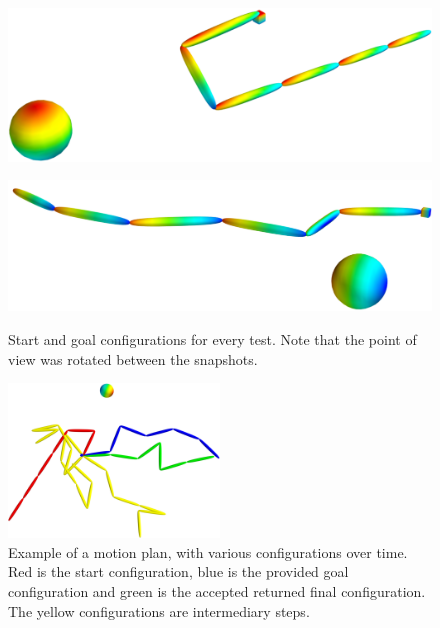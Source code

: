 \begin{figure}[h]
	\centering
	\caption{Start and goal configurations for every test. Note that the point of view was rotated between the snapshots.}
	\begin{minipage}[h]{0.3\textwidth}
		\centering
		\includegraphics[width=1\textwidth]{import/RRT_6DOFSTART2}
		\label{fig:Res6DoFStart}
	\end{minipage}
	\begin{minipage}[h]{0.3\textwidth}
	\centering
	\includegraphics[width=1\textwidth]{import/RRT_6DOFGOAL2}
	\label{fig:Res6DoFGoal}
\end{minipage}

\end{figure}



\begin{figure}[h]
	\centering
	\includegraphics[width=0.5\textwidth]{import/RRT_6DOF_ex}
	\caption{Example of a motion plan, with various configurations over time. Red is the start configuration, blue is the provided goal configuration and green is the accepted returned final configuration. The yellow configurations are intermediary steps.}
	\label{fig:Res6DoFEx}
\end{figure}

